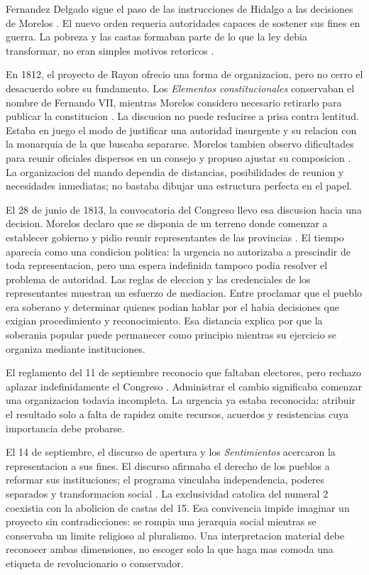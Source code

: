 \documentclass[spanish,letterpaper,oneside]{article}
\begin{document}
Fernandez Delgado sigue el paso de las instrucciones de Hidalgo a
las decisiones de Morelos \citep[pp.~12--19]{fernandez2021}. El nuevo
orden requeria autoridades capaces de sostener sus fines en guerra.
La pobreza y las castas formaban parte de lo que la ley debia
transformar, no eran simples motivos retoricos
\citep[nums.~12 y 15]{morelos2020}.

En 1812, el proyecto de Rayon ofrecio una forma de organizacion,
pero no cerro el desacuerdo sobre su fundamento. Los
\emph{Elementos constitucionales} conservaban el nombre de Fernando
VII, mientras Morelos considero necesario retirarlo para publicar
la constitucion \citep[pp.~49--54]{rayon2021,morelosObservaciones2021}.
La discusion no puede reducirse a prisa contra lentitud. Estaba en
juego el modo de justificar una autoridad insurgente y su relacion
con la monarquia de la que buscaba separarse. Morelos tambien
observo dificultades para reunir oficiales dispersos en un consejo
y propuso ajustar su composicion \citep[p.~53]{morelosObservaciones2021}.
La organizacion del mando dependia de distancias, posibilidades de
reunion y necesidades inmediatas; no bastaba dibujar una estructura
perfecta en el papel.

El 28 de junio de 1813, la convocatoria del Congreso llevo esa
discusion hacia una decision. Morelos declaro que se disponia de
un terreno donde comenzar a establecer gobierno y pidio reunir
representantes de las provincias \citep[pp.~69--70]{morelosConvocatoria2021}.
El tiempo aparecia como una condicion politica: la urgencia no
autorizaba a prescindir de toda representacion, pero una espera
indefinida tampoco podia resolver el problema de autoridad. Las
reglas de eleccion y las credenciales de los representantes muestran
un esfuerzo de mediacion. Entre proclamar que el pueblo era
soberano y determinar quienes podian hablar por el habia decisiones
que exigian procedimiento y reconocimiento. Esa distancia explica
por que la soberania popular puede permanecer como principio
mientras su ejercicio se organiza mediante instituciones.

El reglamento del 11 de septiembre reconocio que faltaban electores,
pero rechazo aplazar indefinidamente el Congreso
\citep[pp.~71--73]{morelosReglamento2021}. Administrar el cambio
significaba comenzar una organizacion todavia incompleta. La urgencia
ya estaba reconocida: atribuir el resultado solo a falta de rapidez
omite recursos, acuerdos y resistencias cuya importancia debe probarse.

El 14 de septiembre, el discurso de apertura y los
\emph{Sentimientos} acercaron la representacion a sus fines.
El discurso afirmaba el derecho de los pueblos a reformar sus
instituciones; el programa vinculaba independencia, poderes
separados y transformacion social
\citep[pp.~78--81]{morelosDiscurso2021}
\citep[nums.~1, 5, 6, 12 y 15]{morelos2020}. La exclusividad
catolica del numeral 2 coexistia con la abolicion de castas del
15. Esa convivencia impide imaginar un proyecto sin
contradicciones: se rompia una jerarquia social mientras se
conservaba un limite religioso al pluralismo. Una interpretacion
material debe reconocer ambas dimensiones, no escoger solo la
que haga mas comoda una etiqueta de revolucionario o conservador.
\end{document}
